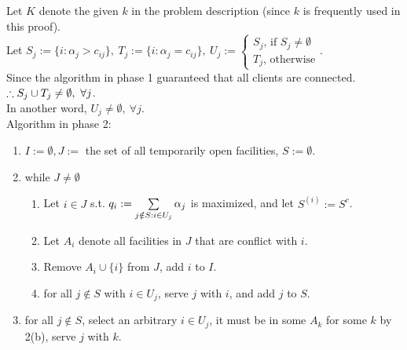 \begin{pr}
Let $K$ denote the given $k$ in the problem description (since $k$ is frequently used in this proof).\\
Let $S_j:=\{i: \alpha_j>c_{ij}\},\ T_j:=\{i: \alpha_j=c_{ij}\},\ U_j:=\begin{cases}
S_j\text{, if }S_j\neq\emptyset\\
T_j\text{, otherwise}
\end{cases}$.\\
Since the algorithm in phase 1 guaranteed that all clients are connected.\\
$\therefore S_j\cup T_j\neq\emptyset,\ \forall j$.\\
In another word, $U_j\neq\emptyset,\ \forall j$.\\
Algorithm in phase 2:
\begin{enumerate}
\item $I:=\emptyset, J:=$ the set of all temporarily open facilities, $S:=\emptyset$.
\item while $J\neq\emptyset$
\begin{enumerate}
\item Let $i\in J$ s.t. $q_i:=\sum\limits_{j\notin S:i\in U_j}\alpha_j$ is maximized, and let $S^{(i)}:=S^c$.
\item Let $A_i$ denote all facilities in $J$ that are conflict with $i$.
\item Remove $A_i\cup\{i\}$ from $J$, add $i$ to $I$.
\item for all $j\notin S$ with $i\in U_j$, serve $j$ with $i$, and add $j$ to $S$.
\end{enumerate}
\item for all $j\notin S$, select an arbitrary $i\in U_j$, it must be in some $A_k$ for some $k$ by 2(b), serve $j$ with $k$.

\end{enumerate}
\end{pr}
